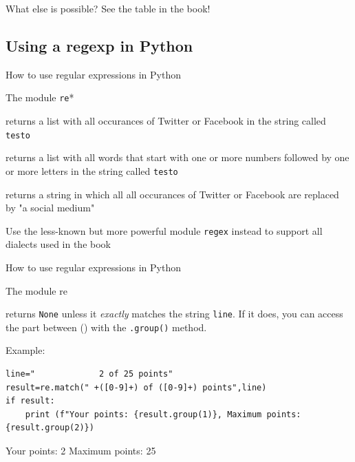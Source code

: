 \documentclass[compress]{beamer}
\begin{document}
\begin{frame}{What else is possible?}
See the table in the book!
\end{frame}

\subsection{Using a regexp in Python}
\begin{frame}{How to use regular expressions in Python}
\begin{block}{The module \texttt{re}*}
\begin{description}
\item<1->[{\tt{re.findall("\lbrack Tt\rbrack witter|\lbrack Ff\rbrack acebook",testo)}}] returns a list with all occurances of Twitter or Facebook in the string called {\tt{testo}}
\item<1->[{\tt{re.findall("\lbrack 0-9\rbrack +\lbrack a-zA-Z\rbrack +",testo)}}] returns a list with all words that start with one or more numbers followed by one or more letters in the string called {\tt{testo}}
\item<2->[{\tt{re.sub("\lbrack Tt\rbrack witter|\lbrack Ff\rbrack acebook","a social medium",testo)}}] returns a string in which all all occurances of Twitter or Facebook are replaced by "a social medium"
\end{description}
\end{block}

\tiny{Use the less-known but more powerful module \texttt{regex} instead to support all dialects used in the book}
\end{frame}


\begin{frame}[fragile]{How to use regular expressions in Python}
\begin{block}{The module re}
\begin{description}
\item<1->[{\tt{re.match(" +(\lbrack 0-9\rbrack +) of (\lbrack 0-9\rbrack +) points",line)}}] returns  \texttt{None} unless it \emph{exactly} matches the string \texttt{line}. If it does, you can access the part between () with the \texttt{.group()} method.
\end{description}
\end{block}

Example:
\begin{lstlisting}
line="             2 of 25 points"
result=re.match(" +([0-9]+) of ([0-9]+) points",line)
if result:
    print (f"Your points: {result.group(1)}, Maximum points: {result.group(2)})
\end{lstlisting}
Your points: 2 Maximum points: 25
\end{frame}
\end{document}
